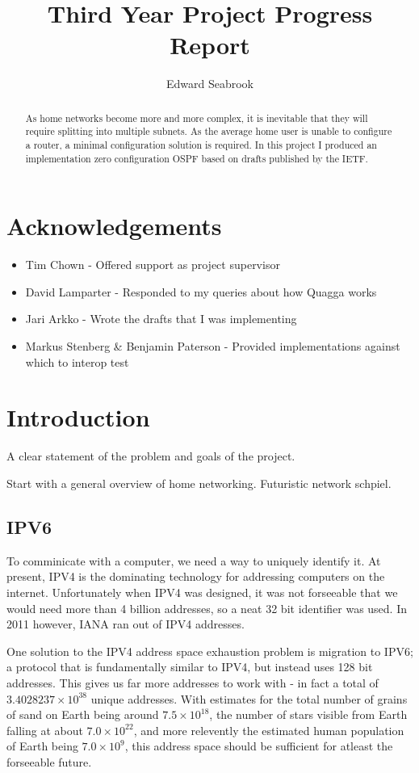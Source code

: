 \documentclass[12pt]{report}
\author{Edward Seabrook}
\title{Third Year Project Progress Report}
\begin{document}


\begin{abstract}
As home networks become more and more complex, it is inevitable that they will
require splitting into multiple subnets. As the average home user is unable to
configure a router, a minimal configuration solution is required. In this
project I produced an implementation zero configuration OSPF based on drafts
published by the IETF. 
\end{abstract}

\tableofcontents
\clearpage

\chapter{Acknowledgements}

\begin{itemize}
\item Tim Chown - Offered support as project supervisor
\item David Lamparter - Responded to my queries about how Quagga works
\item Jari Arkko - Wrote the drafts that I was implementing

\item Markus Stenberg \& Benjamin Paterson - Provided implementations against which to interop test
\end{itemize}

\chapter{Introduction}
A clear statement of the problem and goals of the project.

Start with a general overview of home networking. Futuristic network schpiel.

\section{IPV6}
To comminicate with a computer, we need a way to uniquely identify it. At
present, IPV4 is the dominating technology for addressing computers on the
internet. Unfortunately when IPV4 was designed, it was not forseeable that we
would need more than 4 billion addresses, so a neat 32 bit identifier was used.
In 2011 however, IANA ran out of IPV4 addresses. 

One solution to the IPV4 address space exhaustion problem is migration to
IPV6; a protocol that is fundamentally similar to IPV4, but instead uses 128
bit addresses. This gives us far more addresses to work with - in fact a total
of $3.4028237\times10^{38}$ unique addresses. With estimates for the total
number of grains of sand on Earth being around $7.5\times10^{18}$, the number
of stars visible from Earth falling at about $7.0\times10^{22}$, and more
relevently the estimated human population of Earth being $7.0\times10^{9}$,
this address space should be sufficient for atleast the forseeable future. 
\end{document}
